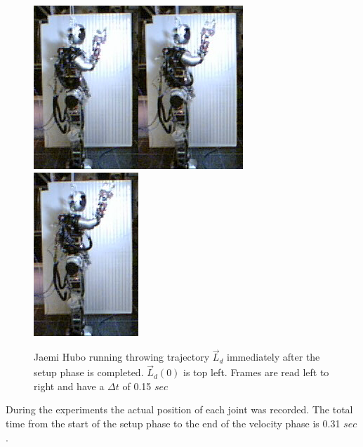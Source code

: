 \begin{figure}[thpb]
\includegraphics[width=0.25\columnwidth]{./pictures/slowMotion/5.png}\includegraphics[width=0.25\columnwidth]{./pictures/slowMotion/6.png}\includegraphics[width=0.25\columnwidth]{./pictures/slowMotion/7.png}
  \caption{Jaemi Hubo running throwing trajectory $\vec{L}_d$ immediately after the setup phase is completed.  $\vec{L}_d(0)$ is top left.  Frames are read left to right and have a $\Delta t$ of 0.15 $sec$}
  \label{fig:3dThrowReal}
\end{figure}

During the experiments the actual position of each joint was recorded.  The total time from the start of the setup phase to the end of the velocity phase is 0.31 $sec$.

